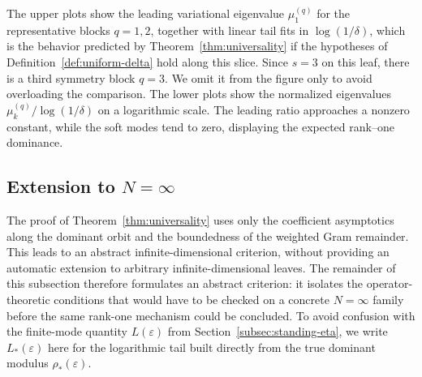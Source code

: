 \documentclass[11pt]{amsart}
\numberwithin{equation}{section}
\theoremstyle{plain}
\theoremstyle{definition}
\theoremstyle{remark}
\begin{document}
The upper plots show the leading variational eigenvalue \(\mu_1^{(q)}\) for the
representative blocks \(q=1,2\), together with linear tail fits in \(\log(1/\delta)\),
which is the behavior predicted by Theorem~\ref{thm:universality} if the
hypotheses of Definition~\ref{def:uniform-delta} hold along this slice. Since
\(s=3\) on this leaf, there is a third symmetry block \(q=3\). We omit it from
the figure only to avoid overloading the comparison. The lower plots show the
normalized eigenvalues \(\mu_k^{(q)}/\log(1/\delta)\) on a logarithmic scale.
The leading ratio approaches a nonzero constant, while the soft modes tend to
zero, displaying the expected rank--one dominance.


\subsection{Extension to \texorpdfstring{\(N=\infty\)}{N=infinity}}
\label{subsec:infty-extension}

The proof of Theorem~\ref{thm:universality} uses only the coefficient
asymptotics along the dominant orbit and the boundedness of the weighted Gram
remainder. This leads to an abstract infinite-dimensional criterion, without providing an automatic extension to arbitrary infinite-dimensional leaves. The remainder of
this subsection therefore formulates an abstract criterion: it isolates the
operator-theoretic conditions that would have to be checked on a concrete
\(N=\infty\) family before the same rank-one mechanism could be concluded. To avoid
confusion with the finite-mode quantity \(L(\varepsilon)\) from
Section~\ref{subsec:standing-eta}, we write \(L_*(\varepsilon)\) here for the
logarithmic tail built directly from the true dominant modulus
\(\rho_*(\varepsilon)\).
\end{document}

